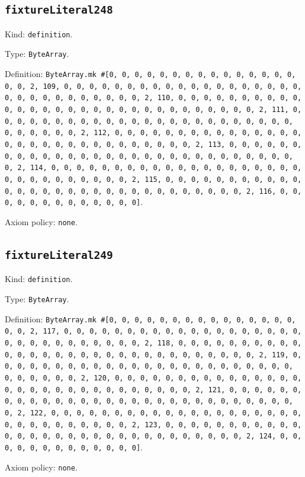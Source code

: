 \documentclass[11pt]{article}
\begin{document}
\subsection*{\texttt{fixtureLiteral248}}
\noindent Kind: \texttt{definition}.\par
\noindent Type: \texttt{ByteArray}.\par
\noindent Definition: \texttt{ByteArray.mk \#[0, 0, 0, 0, 0, 0, 0, 0, 0, 0, 0, 0, 0, 0, 0, 0, 0, 2, 109, 0, 0, 0, 0, 0, 0, 0, 0, 0, 0, 0, 0, 0, 0, 0, 0, 0, 0, 0, 0, 0, 0, 0, 0, 0, 0, 0, 0, 0, 0, 2, 110, 0, 0, 0, 0, 0, 0, 0, 0, 0, 0, 0, 0, 0, 0, 0, 0, 0, 0, 0, 0, 0, 0, 0, 0, 0, 0, 0, 0, 0, 0, 2, 111, 0, 0, 0, 0, 0, 0, 0, 0, 0, 0, 0, 0, 0, 0, 0, 0, 0, 0, 0, 0, 0, 0, 0, 0, 0, 0, 0, 0, 0, 0, 2, 112, 0, 0, 0, 0, 0, 0, 0, 0, 0, 0, 0, 0, 0, 0, 0, 0, 0, 0, 0, 0, 0, 0, 0, 0, 0, 0, 0, 0, 0, 0, 2, 113, 0, 0, 0, 0, 0, 0, 0, 0, 0, 0, 0, 0, 0, 0, 0, 0, 0, 0, 0, 0, 0, 0, 0, 0, 0, 0, 0, 0, 0, 0, 2, 114, 0, 0, 0, 0, 0, 0, 0, 0, 0, 0, 0, 0, 0, 0, 0, 0, 0, 0, 0, 0, 0, 0, 0, 0, 0, 0, 0, 0, 0, 0, 2, 115, 0, 0, 0, 0, 0, 0, 0, 0, 0, 0, 0, 0, 0, 0, 0, 0, 0, 0, 0, 0, 0, 0, 0, 0, 0, 0, 0, 0, 0, 0, 2, 116, 0, 0, 0, 0, 0, 0, 0, 0, 0, 0, 0, 0, 0]}.\par
\noindent Axiom policy: \texttt{none}.\par
\subsection*{\texttt{fixtureLiteral249}}
\noindent Kind: \texttt{definition}.\par
\noindent Type: \texttt{ByteArray}.\par
\noindent Definition: \texttt{ByteArray.mk \#[0, 0, 0, 0, 0, 0, 0, 0, 0, 0, 0, 0, 0, 0, 0, 0, 0, 2, 117, 0, 0, 0, 0, 0, 0, 0, 0, 0, 0, 0, 0, 0, 0, 0, 0, 0, 0, 0, 0, 0, 0, 0, 0, 0, 0, 0, 0, 0, 0, 2, 118, 0, 0, 0, 0, 0, 0, 0, 0, 0, 0, 0, 0, 0, 0, 0, 0, 0, 0, 0, 0, 0, 0, 0, 0, 0, 0, 0, 0, 0, 0, 2, 119, 0, 0, 0, 0, 0, 0, 0, 0, 0, 0, 0, 0, 0, 0, 0, 0, 0, 0, 0, 0, 0, 0, 0, 0, 0, 0, 0, 0, 0, 0, 2, 120, 0, 0, 0, 0, 0, 0, 0, 0, 0, 0, 0, 0, 0, 0, 0, 0, 0, 0, 0, 0, 0, 0, 0, 0, 0, 0, 0, 0, 0, 0, 2, 121, 0, 0, 0, 0, 0, 0, 0, 0, 0, 0, 0, 0, 0, 0, 0, 0, 0, 0, 0, 0, 0, 0, 0, 0, 0, 0, 0, 0, 0, 0, 2, 122, 0, 0, 0, 0, 0, 0, 0, 0, 0, 0, 0, 0, 0, 0, 0, 0, 0, 0, 0, 0, 0, 0, 0, 0, 0, 0, 0, 0, 0, 0, 2, 123, 0, 0, 0, 0, 0, 0, 0, 0, 0, 0, 0, 0, 0, 0, 0, 0, 0, 0, 0, 0, 0, 0, 0, 0, 0, 0, 0, 0, 0, 0, 2, 124, 0, 0, 0, 0, 0, 0, 0, 0, 0, 0, 0, 0, 0]}.\par
\noindent Axiom policy: \texttt{none}.\par
\end{document}
